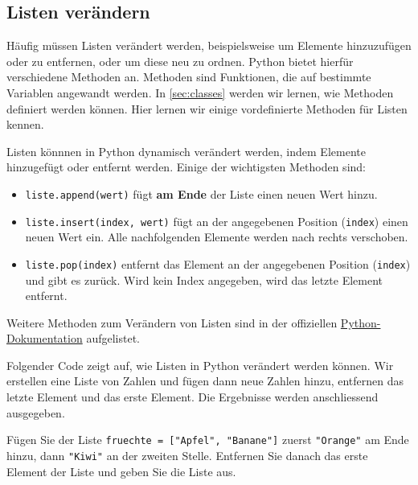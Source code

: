 \subsection{Listen verändern}

Häufig müssen Listen verändert werden, beispielsweise um Elemente hinzuzufügen oder zu entfernen, oder um diese neu zu ordnen. Python bietet hierfür verschiedene Methoden an. Methoden sind Funktionen, die auf bestimmte Variablen angewandt werden. In \ref{sec:classes} werden wir lernen, wie Methoden definiert werden können. Hier lernen wir einige vordefinierte Methoden für Listen kennen.

\begin{mydefinition}
Listen könnnen in Python dynamisch verändert werden, indem Elemente hinzugefügt oder entfernt werden. Einige der wichtigsten Methoden sind:
\begin{itemize}
	\item \lstinline|liste.append(wert)| fügt \textbf{am Ende} der Liste einen neuen Wert hinzu.
	\item \lstinline|liste.insert(index, wert)| fügt an der angegebenen Position (\texttt{index}) einen neuen Wert ein. Alle nachfolgenden Elemente werden nach rechts verschoben.
	\item \lstinline|liste.pop(index)| entfernt das Element an der angegebenen Position (\texttt{index}) und gibt es zurück. Wird kein Index angegeben, wird das letzte Element entfernt.
\end{itemize}
Weitere Methoden zum Verändern von Listen sind in der offiziellen \href{https://docs.python.org/3/tutorial/datastructures.html#more-on-lists}{Python-Dokumentation} aufgelistet.
\end{mydefinition}

\begin{myexample}
Folgender Code zeigt auf, wie Listen in Python verändert werden können. Wir erstellen eine Liste von Zahlen und fügen dann neue Zahlen hinzu, entfernen das letzte Element und das erste Element. Die Ergebnisse werden anschliessend ausgegeben.

\end{myexample}

\begin{myexercise}
	Fügen Sie der Liste \lstinline|fruechte = ["Apfel", "Banane"]| zuerst \lstinline|"Orange"| am Ende hinzu, dann \lstinline|"Kiwi"| an der zweiten Stelle. Entfernen Sie danach das erste Element der Liste und geben Sie die Liste aus.

	\begin{myanswer}
		
	\end{myanswer}
\end{myexercise}

